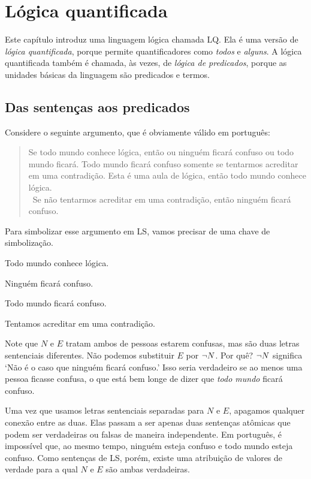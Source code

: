 \chapter{Lógica quantificada}
\label{ch.QL}

Este capítulo introduz uma linguagem lógica chamada LQ. Ela é uma versão de \emph{lógica quantificada}, porque permite quantificadores como \emph{todos} e \emph{alguns}. A lógica quantificada também é chamada, às vezes, de \emph{lógica de predicados}, porque as unidades básicas da linguagem são predicados e termos.


\section{Das sentenças aos predicados}
Considere o seguinte argumento, que é obviamente válido em português:
\begin{quote}
Se todo mundo conhece lógica, então ou ninguém ficará confuso ou todo mundo ficará. Todo mundo ficará confuso somente se tentarmos acreditar em uma contradição. Esta é uma aula de lógica, então todo mundo conhece lógica.\\
\therefore\ Se não tentarmos acreditar em uma contradição, então ninguém ficará confuso.
\end{quote}
Para simbolizar esse argumento em LS, vamos precisar de uma chave de simbolização.
\begin{ekey}
\item[L:] Todo mundo conhece lógica.
\item[N:] Ninguém ficará confuso.
\item[E:] Todo mundo ficará confuso.
\item[B:] Tentamos acreditar em uma contradição.
\end{ekey}
Note que $N$ e $E$ tratam ambos de pessoas estarem confusas, mas são duas letras sentenciais diferentes. Não podemos substituir $E$ por $\neg N$. Por quê? $\neg N$ significa `Não é o caso que ninguém ficará confuso.' Isso seria verdadeiro se ao menos uma pessoa ficasse confusa, o que está bem longe de dizer que \emph{todo mundo} ficará confuso.

Uma vez que usamos letras sentenciais separadas para $N$ e $E$, apagamos qualquer conexão entre as duas. Elas passam a ser apenas duas sentenças atômicas que podem ser verdadeiras ou falsas de maneira independente. Em português, é impossível que, ao mesmo tempo, ninguém esteja confuso e todo mundo esteja confuso. Como sentenças de LS, porém, existe uma atribuição de valores de verdade para a qual $N$ e $E$ são ambas verdadeiras.

